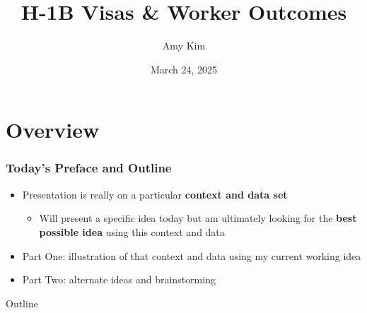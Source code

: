 \documentclass[xcolor=dvipsnames, compress, 12pt, aspectratio=169, handout]{beamer}
\title{H-1B Visas \& Worker Outcomes}
\author{Amy Kim}
\date{March 24, 2025}
\begin{document}
\begin{frame}[plain]
    \titlepage
\end{frame}

\section{Overview}
\begin{frame}
    \frametitle{Today's Preface and Outline}
    \begin{itemize}
        \item Presentation is really on a particular \textbf{context and data set}
        \begin{itemize}
            \item Will present a specific idea today but am ultimately looking for the \textbf{best possible idea} using this context and data
        \end{itemize}
        \item Part One: illustration of that context and data using my current working idea
        \item Part Two: alternate ideas and brainstorming
    \end{itemize}
\end{frame}

\begin{frame}[plain]{Outline}
    \tableofcontents
\end{frame}


\end{document}
